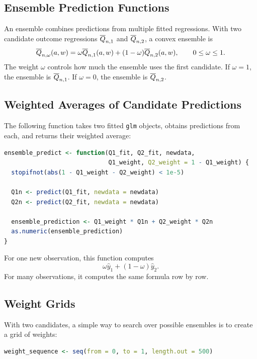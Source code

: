 \label{lec:6-3}

\subsection{Ensemble Prediction Functions}

An ensemble combines predictions from multiple fitted regressions. With two
candidate outcome regressions $\overline{Q}_{n,1}$ and $\overline{Q}_{n,2}$, a convex ensemble is
\[
\overline{Q}_{n,\omega}(a,w)
=
\omega \overline{Q}_{n,1}(a,w)+(1-\omega)\overline{Q}_{n,2}(a,w),
\qquad 0\le \omega\le 1.
\]
The weight $\omega$ controls how much the ensemble uses the first candidate. If
$\omega=1$, the ensemble is $\overline{Q}_{n,1}$. If $\omega=0$, the ensemble is
$\overline{Q}_{n,2}$.

\subsection{Weighted Averages of Candidate Predictions}

The following function takes two fitted \texttt{glm} objects, obtains predictions from
each, and returns their weighted average:

\begin{implementationbox}
\begin{lstlisting}[language=R]
ensemble_predict <- function(Q1_fit, Q2_fit, newdata,
                             Q1_weight, Q2_weight = 1 - Q1_weight) {
  stopifnot(abs(1 - Q1_weight - Q2_weight) < 1e-5)

  Q1n <- predict(Q1_fit, newdata = newdata)
  Q2n <- predict(Q2_fit, newdata = newdata)

  ensemble_prediction <- Q1_weight * Q1n + Q2_weight * Q2n
  as.numeric(ensemble_prediction)
}
\end{lstlisting}
\end{implementationbox}

For one new observation, this function computes
\[
\omega \hat y_1+(1-\omega)\hat y_2.
\]
For many observations, it computes the same formula row by row.

\subsection{Weight Grids}

With two candidates, a simple way to search over possible ensembles is to create a
grid of weights:

\begin{implementationbox}
\begin{lstlisting}[language=R]
weight_sequence <- seq(from = 0, to = 1, length.out = 500)
\end{lstlisting}
\end{implementationbox}

